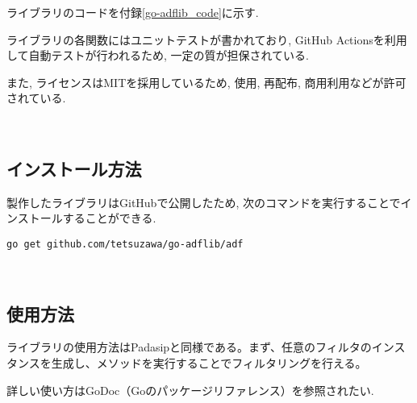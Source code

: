 ライブラリのコードを付録\ref{go-adflib_code}に示す. 

ライブラリの各関数にはユニットテストが書かれており, GitHub
Actionsを利用して自動テストが行われるため, 一定の質が担保されている. 

また, ライセンスはMITを採用しているため, 使用, 再配布, 商用利用などが許可されている. %

\
\subsection{インストール方法}\label{how-to-install}

製作したライブラリはGitHub\cite{go-adflib:online}で公開したため, 次のコマンドを実行することでインストールすることができる. 

\texttt{go\ get\ github.com/tetsuzawa/go-adflib/adf}

\
\subsection{使用方法}\label{how-to-use}




ライブラリの使用方法はPadasipと同様である。まず、任意のフィルタのインスタンスを生成し、メソッドを実行することでフィルタリングを行える。

詳しい使い方はGoDoc（Goのパッケージリファレンス）\cite{godoc:online}を参照されたい. 
